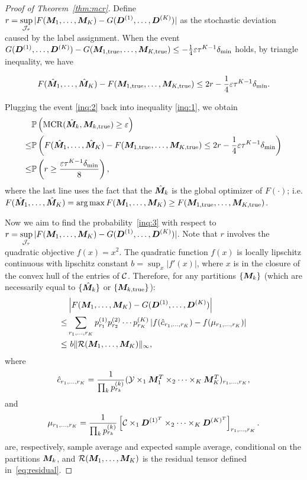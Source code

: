\documentclass{article}
\DeclareMathOperator*{\mcr}{MCR}
\begin{document}
\begin{appendices}
\begin{proof}[Proof of Theorem~\ref{thm:mcr}]
Define $r=\displaystyle\sup_{\mathcal{J}_\tau} |F(\bm M_1,\ldots,\bm M_K)-G(\bm{D}^{(1)},\ldots,\bm{D}^{(K)})|$ as the stochastic deviation caused by the label assignment. When the event $G(\bm{D}^{(1)},\ldots,\bm{D}^{(K)})-G(\bm M_{1,\text{true}},\ldots,\bm M_{K,\text{true}})\leq -\frac{1}{4}\varepsilon\tau^{K-1}\delta_{\min}$ holds, by triangle inequality, we have

\begin{equation} \label{inq:2}
F(\hat{\bm M}_1,\ldots,\hat{\bm M}_K)-F(\bm M_{1,\text{true}},\ldots,\bm M_{K,\text{true}})\leq  2r-\frac{1}{4}\varepsilon\tau^{K-1}\delta_{\min}.
\end{equation}

Plugging the event \eqref{inq:2} back into inequality \eqref{inq:1}, we obtain
\begin{align}\label{inq:3}
    &\mathbb{P}\left(\mcr(\hat{\mM}_k, \mM_{k,\text{true}})\geq \varepsilon\right)\notag \\
    \leq & \mathbb{P}\left(F(\hat{\mM}_1,\ldots,\hat{\mM}_K)-F(\mM_{1,\text{true}},\ldots,\mM_{K,\text{true}})\leq 2r-\frac{1}{4}\varepsilon\tau^{K-1}\delta_{\min}\right)\notag \\
    \leq & \mathbb{P}\left(r \geq\frac{\varepsilon\tau^{K-1}\delta_{\min}}{8}\right),
\end{align}
where the last line uses the fact that the ${\hat{\bm M}_k}$ is the global optimizer of $F(\cdot)$; i.e. $F(\hat{\bm M}_1,\ldots,\hat {\bm M}_K)=\arg\max F(\bm M_1,\ldots,\bm M_K)\geq F(\bm M_{1,\text{true}},\ldots, \bm M_{K,\text{true}})$.


Now we aim to find the probability~\eqref{inq:3} with respect to $r=\displaystyle\sup_{\mathcal{J}_\tau} |F(\bm M_1,\ldots,\bm M_K)-G(\bm{D}^{(1)},\ldots,\bm{D}^{(K)})|$. Note that $r$ involves the quadratic objective $f(x)=x^2$. The quadratic function $f(x)$ is locally lipschitz continuous with lipschitz constant $b = \sup_x|f'(x)|$, where $x$ is in the closure of the convex hull of the entries of $\mathcal{C}$. Therefore, for any partitions $\{\bm M_k\}$ (which are necessarily equal to $\{\hat {\bm M}_k\}$ or $\{\bm M_{k,\text{true}}\}$):
\begin{align}\label{inq:4}
&\left|F(\bm M_1,\ldots,\bm M_K)-G(\bm{D}^{(1)}, \ldots,\bm{D}^{(K)})\right|\notag \\
\leq&\sum_{r_1,\ldots,r_K}p_{r_1}^{(1)}p_{r_2}^{(2)}\cdots p_{r_K}^{(K)}\left|f(\hat c_{r_1,\ldots,r_K})-f(\mu_{r_1,\ldots,r_K})\right|\notag \\
\leq& \ b\lVert\mathcal{R}(\bm M_1,\ldots,\bm M_K)\rVert_\infty,
\end{align}
where 
\[
\hat c_{r_1,\ldots,r_K}={1\over \prod_k p^{(k)}_{r_k}}  (\mathcal{Y}\times_1 \bm M^T_1\times_2\cdots\times_K\bm M^T_K)_{r_1,\ldots,r_K},
\]
and
\[
\mu_{r_1,\ldots,r_K}={1\over \prod_k  p^{(k)}_{r_k}}\left[ \mathcal{C}\times_1 \bm{D}^{(1)^T} \times_2\cdots\times_K \bm{D}^{(K)^T}\right]_{r_1,\ldots,r_K}.
\]
are, respectively, sample average and expected sample average, conditional on the partitions ${\bm M_k}$, and $\mathcal{R}( \bm M_1,\ldots,\bm M_K)$ is the residual tensor defined in~\eqref{eq:residual}. 


\end{proof}
\end{appendices}
\end{document}
